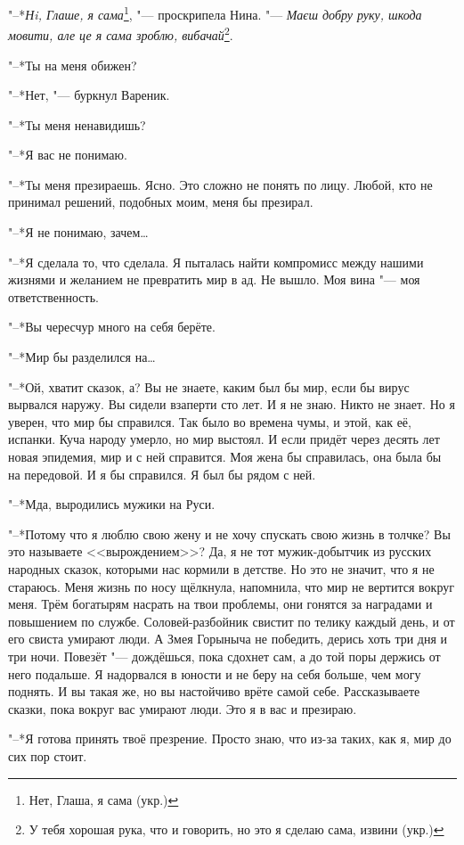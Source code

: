 "--*\textit{Нi, Глаше, я сама}\footnote{Нет, Глаша, я сама (укр.)}, "--- проскрипела Нина.
"--- \textit{Маєш добру руку, шкода мовити, але це я сама зроблю, вибачай}\footnote{У тебя хорошая рука, что и говорить, но это я сделаю сама, извини (укр.)}.

\asterism

"--*Ты на меня обижен?

"--*Нет, "--- буркнул Вареник.

"--*Ты меня ненавидишь?

"--*Я вас не понимаю.

"--*Ты меня презираешь.
Ясно.
Это сложно не понять по лицу.
Любой, кто не принимал решений, подобных моим, меня бы презирал.

"--*Я не понимаю, зачем\ldots{}

"--*Я сделала то, что сделала.
Я пыталась найти компромисс между нашими жизнями и желанием не превратить мир в ад.
Не вышло.
Моя вина "--- моя ответственность.

"--*Вы чересчур много на себя берёте.

"--*Мир бы разделился на\ldots{}

"--*Ой, хватит сказок, а?
Вы не знаете, каким был бы мир, если бы вирус вырвался наружу.
Вы сидели взаперти сто лет.
И я не знаю.
Никто не знает.
Но я уверен, что мир бы справился.
Так было во времена чумы, и этой, как её, испанки.
Куча народу умерло, но мир выстоял.
И если придёт через десять лет новая эпидемия, мир и с ней справится.
Моя жена бы справилась, она была бы на передовой.
И я бы справился.
Я был бы рядом с ней.

"--*Мда, выродились мужики на Руси.

"--*Потому что я люблю свою жену и не хочу спускать свою жизнь в толчке?
Вы это называете <<вырождением>>?
Да, я не тот мужик-добытчик из русских народных сказок, которыми нас кормили в детстве.
Но это не значит, что я не стараюсь.
Меня жизнь по носу щёлкнула, напомнила, что мир не вертится вокруг меня.
Трём богатырям насрать на твои проблемы, они гонятся за наградами и повышением по службе.
Соловей-разбойник свистит по телику каждый день, и от его свиста умирают люди.
А Змея Горыныча не победить, дерись хоть три дня и три ночи.
Повезёт "--- дождёшься, пока сдохнет сам, а до той поры держись от него подальше.
Я надорвался в юности и не беру на себя больше, чем могу поднять.
И вы такая же, но вы настойчиво врёте самой себе.
Рассказываете сказки, пока вокруг вас умирают люди.
Это я в вас и презираю.

"--*Я готова принять твоё презрение.
Просто знаю, что из-за таких, как я, мир до сих пор стоит.

